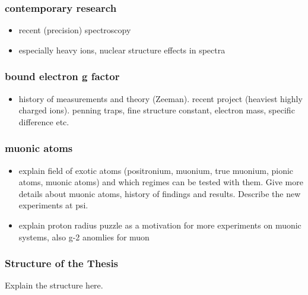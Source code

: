 \subsubsection*{contemporary research}
\begin{itemize}
\item recent (precision) spectroscopy
\item especially heavy ions, nuclear structure effects in spectra
\end{itemize}

\subsubsection*{bound electron g factor}
\begin{itemize}
\item
history of measurements and theory (Zeeman). recent project (heaviest highly charged ions). penning traps, fine structure constant, electron mass, specific difference etc.
\end{itemize}

\subsubsection*{muonic atoms}
\begin{itemize}
\item
explain field of exotic atoms (positronium, muonium, true muonium, pionic atoms, muonic atoms) and which regimes can be tested with them. Give more details about muonic atoms, history of findings and results. Describe the new experiments at psi.
\item 
explain proton radius puzzle as a motivation for more experiments on muonic systems, also g-2 anomlies for muon
\end{itemize}



\subsubsection*{Structure of the Thesis}

Explain the structure here.




